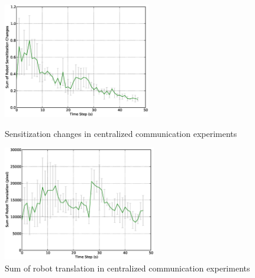 \documentclass{llncs}
\begin{document}
\begin{figure}
\begin{minipage}[t]{0.5\linewidth}
\centering
\includegraphics[height=5cm, angle=0]
{images/global/RobotSensitizationStat-Total-50steps.eps}
\caption{\small Sensitization changes in centralized communication experiments}
\label{fig:sensitization-stat} %
\end{minipage}
\hspace{0.5cm}
\begin{minipage}[t]{0.5\linewidth}
\centering
\includegraphics[height=5cm, angle=0]{images/global/DeltaTranslationStat.eps}
\caption{\small Sum of robot translation in centralized communication experiments}
\label{fig:translation-stat} %
\end{minipage}
\end{figure}
\end{document}

